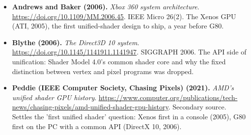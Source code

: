 \documentclass[11pt,letterpaper]{article}
\begin{document}
\begin{itemize}[leftmargin=1.2em,itemsep=3pt]
\item \textbf{Andrews and Baker (2006).} \textit{Xbox 360 system architecture}. \url{https://doi.org/10.1109/MM.2006.45}. IEEE Micro 26(2). The Xenos GPU (ATI, 2005), the first unified-shader design to ship, a year before G80.
\item \textbf{Blythe (2006).} \textit{The Direct3D 10 system}. \url{https://doi.org/10.1145/1141911.1141947}. SIGGRAPH 2006. The API side of unification: Shader Model 4.0's common shader core and why the fixed distinction between vertex and pixel programs was dropped.
\item \textbf{Peddie (IEEE Computer Society, Chasing Pixels) (2021).} \textit{AMD's unified shader GPU history}. \url{https://www.computer.org/publications/tech-news/chasing-pixels/amd-unified-shader-gpu-history}. Secondary source. Settles the 'first unified shader' question: Xenos first in a console (2005), G80 first on the PC with a common API (DirectX 10, 2006).
\end{itemize}
\end{document}
